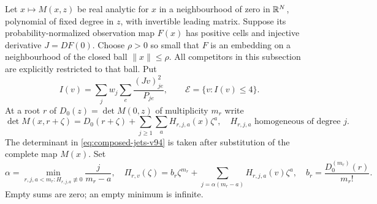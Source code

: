 Let $x\mapsto M(x,z)$ be real analytic for $x$ in a neighbourhood
of zero in $\mathbb R^N$, polynomial of fixed degree in $z$, with invertible
leading matrix. Suppose its probability-normalized observation map
$F(x)$ has positive cells and injective derivative $J=DF(0)$.
Choose $\rho>0$ so small that $F$ is an embedding on a neighbourhood
of the closed ball $\|x\|\le\rho$. All competitors in this subsection
are explicitly restricted to that ball. Put
\[
 I(v)=\sum_jw_j\sum_e\frac{(Jv)_{je}^2}{P_{je}},
 \qquad \mathcal E=\{v:I(v)\le4\}.
\]
At a root $r$ of $D_0(z)=\det M(0,z)$ of multiplicity $m_r$ write
\begin{equation}\label{eq:composed-jets-v94}
 \det M(x,r+\zeta)=D_0(r+\zeta)
            +\sum_{j\ge1}\sum_a H_{r,j,a}(x)\zeta^a,
 \quad H_{r,j,a}\text{ homogeneous of degree }j.
\end{equation}
The determinant in \eqref{eq:composed-jets-v94} is taken after
substitution of the complete map $M(x)$.
Set
\[
 \alpha=\min_{r,j,a<m_r:H_{r,j,a}\not\equiv0}\frac{j}{m_r-a},
 \quad
 \Pi_{r,v}(\zeta)=b_r\zeta^{m_r}
       +\sum_{j=\alpha(m_r-a)}H_{r,j,a}(v)\zeta^a,
 \quad b_r=\frac{D_0^{(m_r)}(r)}{m_r!}.
\]
Empty sums are zero; an empty minimum is infinite.

